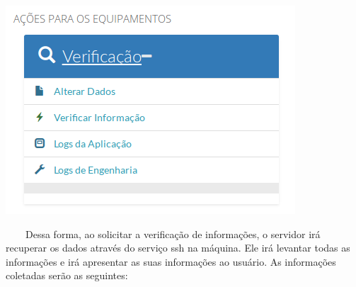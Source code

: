        \begin{center}
        \includegraphics[width=10.82cm,height=7.777cm]{figuras/RATCETECATMSTFLS051718v2-img003.png}
        \end{center}
{\color{black}
    \ \ \ \ Dessa forma, ao solicitar a verifica\c{c}\~ao de informa\c{c}\~oes, o servidor ir\'a recuperar os dados
        atrav\'es do servi\c{c}o ssh na m\'aquina. Ele ir\'a levantar todas as informa\c{c}\~oes e ir\'a apresentar as suas
        informa\c{c}\~oes ao usu\'ario. As informa\c{c}\~oes coletadas ser\~ao as seguintes:}


        \bigskip

{\color{black}
    \ \ }


